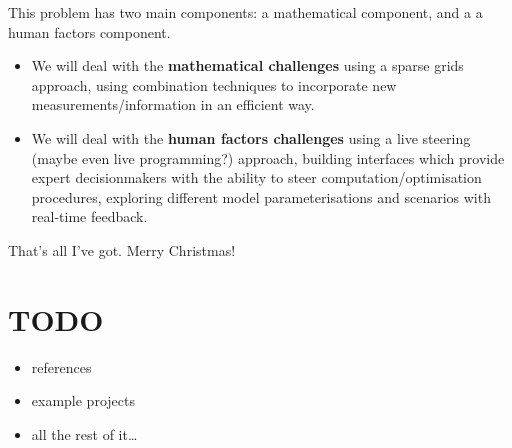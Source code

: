 \documentclass[a4paper,fontsize=12pt]{scrartcl}
\begin{document}
This problem has two main components: a mathematical component, and a
a human factors component.
\begin{itemize}
\item We will deal with the \textbf{mathematical challenges} using a
  sparse grids approach, using combination techniques
  to incorporate new measurements/information in an efficient way.
\item We will deal with the \textbf{human factors challenges} using a
  live steering (maybe even live programming?) approach, building
  interfaces which provide expert decisionmakers with the ability to
  steer computation/optimisation procedures, exploring different model
  parameterisations and scenarios with real-time feedback.
\end{itemize}

That's all I've got. Merry Christmas!

\section{TODO}
\label{sec:todo}

\begin{itemize}
\item references
\item example projects
\item all the rest of it\ldots
\end{itemize}



\printbibliography[title=References]
\end{document}
